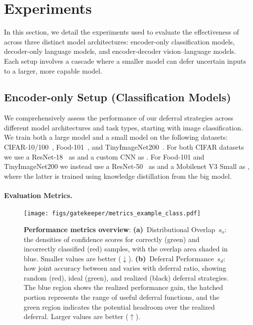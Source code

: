     \section{Experiments}
\label{sec:experiments}

In this section, we detail the experiments used to evaluate the effectiveness of \loss across three distinct model architectures: encoder-only classification models, decoder-only language models, and encoder-decoder vision–language models. Each setup involves a cascade where a smaller model can defer uncertain inputs to a larger, more capable model.


\sloppy
\subsection{Encoder-only Setup (Classification Models)}
\label{sec:class_exp}

We comprehensively assess the performance of our deferral strategies across different model architectures and task types, starting with image classification. We train both a large model and a small model on the following datasets: CIFAR-10/100~\citep{krizhevsky2009learning}, Food-101~\citep{bossard14}, and TinyImageNet200~\citep{Le2015TinyIV}. For both CIFAR datasets we use a ResNet-18~\citep{he2016deep} as \bigmodel and a custom CNN as \smallmodel. For Food-101 and TinyImageNet200 we instead use a ResNet-50~\citep{he2016deep} as \bigmodel and a Mobilenet V3 Small \citep{howard2019searching} as \smallmodel, where the latter is trained using knowledge distillation from the big model.

\paragraph{Evaluation Metrics.}

\begin{figure}[t]
    \centering
    \texttt{[image: figs/gatekeeper/metrics\_example\_class.pdf]}
    \caption[Performance metrics overview.]{%
    \textbf{Performance metrics overview}: \textbf{(a)}~Distributional Overlap~$s_o$: the densities of confidence scores for correctly (green) and incorrectly classified (red) samples, with the overlap area shaded in blue. Smaller values are better ($\downarrow$).
    \textbf{(b)}~Deferral Performance~$s_d$: how joint accuracy between \smallmodel and \bigmodel varies with deferral ratio, showing random (red), ideal (green), and realized (black) deferral strategies. 
    The blue region shows the realized performance gain, the hatched portion represents the range of useful deferral functions, and the green region indicates the potential headroom over the realized deferral. Larger values are better ($\uparrow$).}
    \label{fig:metrics_illustration}
\end{figure}

